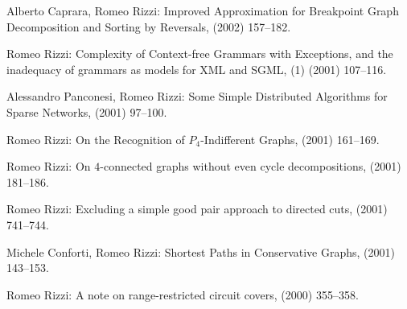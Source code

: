 \begin{etaremune}
  \item {\sc Alberto Caprara, Romeo Rizzi:}
   \newblock  Improved Approximation for Breakpoint Graph Decomposition
              and Sorting by Reversals,
    (2002) 157--182.

  \item {\sc Romeo Rizzi:}
   \newblock  Complexity of Context-free Grammars with Exceptions,
              and the inadequacy of grammars as models for XML and SGML,
   (1) (2001) 107--116.

  \item {\sc Alessandro Panconesi, Romeo Rizzi:}
   \newblock  Some Simple Distributed Algorithms for Sparse Networks,
    (2001) 97--100.

  \item {\sc Romeo Rizzi:}
   \newblock  On the Recognition of $P_4$-Indifferent Graphs,
    (2001) 161--169.

  \item {\sc Romeo Rizzi:}
   \newblock  On $4$-connected graphs without even cycle decompositions,
    (2001) 181--186.

  \item {\sc Romeo Rizzi:}
   \newblock  Excluding a simple good pair approach to directed cuts,
    (2001) 741--744.

  \item {\sc Michele Conforti, Romeo Rizzi:}  
   \newblock  Shortest Paths in Conservative Graphs,
    (2001) 143--153.

  \item {\sc Romeo Rizzi:}
   \newblock  A note on range-restricted circuit covers,
    (2000) 355--358.


\end{etaremune}
